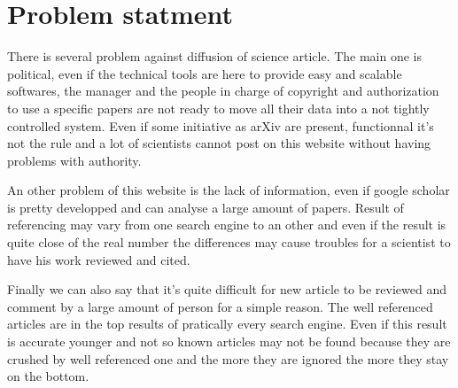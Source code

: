 \section{Problem statment}

There is several problem against diffusion of science article.
The main one is political, even if the technical tools are here to
provide easy and scalable softwares, the manager and the people in charge
of copyright and authorization to use a specific papers are not ready 
to move all their data into a not tightly controlled system. Even if some
initiative as arXiv are present, functionnal it's not the rule and a lot 
of scientists cannot post on this website without having problems with authority.

An other problem of this website is the lack of information, even if google scholar
is pretty developped and can analyse a large amount of papers. Result of referencing may 
vary from one search engine to an other and even if the result is quite close of the real 
number the differences may cause troubles for a scientist to have his work reviewed and cited.

Finally we can also say that it's quite difficult for new article to be reviewed and comment 
by a large amount of person for a simple reason. The well referenced articles are in the top results
of pratically every search engine. Even if this result is accurate younger and not so known articles 
may not be found because they are crushed by well referenced one and the more they are ignored the more 
they stay on the bottom.
